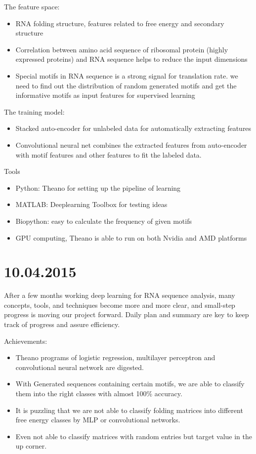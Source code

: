 \documentclass[paper=a4, fontsize=12pt]{scrartcl}	%
\numberwithin{equation}{section}					%
\numberwithin{figure}{section}					%
\numberwithin{table}{section}					%
\begin{document}
The feature space:
\begin{itemize}
\item RNA folding structure, features related to free energy and secondary structure
\item Correlation between amino acid sequence of ribosomal protein (highly expressed proteins) and RNA sequence helps to reduce the input dimensions 
\item Special motifs in RNA sequence is a strong signal for translation rate. we need to find out the distribution of random generated motifs and get the informative motifs as input features for supervised learning
\end{itemize}

The training model:
\begin{itemize}
\item Stacked auto-encoder for unlabeled data for automatically extracting features
\item Convolutional neural net combines the extracted features from auto-encoder with motif features and other features to fit the labeled data. 
\end{itemize}

Tools 
\begin{itemize}
\item Python: Theano for setting up the pipeline of learning
\item MATLAB: Deeplearning Toolbox for testing ideas
\item Biopython: easy to calculate the frequency of given motifs
\item GPU computing, Theano is able to run on both Nvidia and AMD platforms
\end{itemize}

\section*{10.04.2015}
After a few months working deep learning for RNA sequence analysis, many concepts, tools, and techniques become more and more clear, and small-step progress is moving our project forward. Daily plan and summary are key to keep track of progress and assure efficiency. 

Achievements:
\begin{itemize}
\item Theano programs of logistic regression, multilayer perceptron and convolutional neural network are digested. 
\item With Generated sequences containing certain motifs, we are able to classify them into the right classes with almost 100\% accuracy. 
\item It is puzzling that we are not able to classify folding matrices into different free energy classes by MLP or convolutional networks. 
\item Even not able to classify matrices with random entries but target value in the up corner.
\end{itemize}
\end{document}
